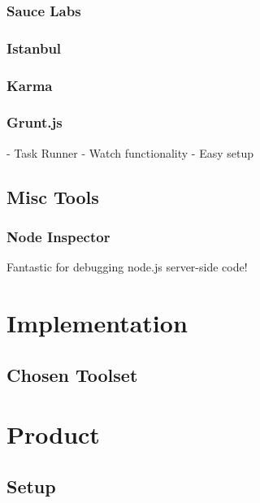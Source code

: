 \documentclass[11pt]{article}
\begin{document}
\subsubsection{Sauce Labs}


\subsubsection{Istanbul}


\subsubsection{Karma}

\subsubsection{Grunt.js}
- Task Runner
- Watch functionality
- Easy setup

\subsection{Misc Tools}
\subsubsection{Node Inspector}
Fantastic for debugging node.js server-side code!

\section{Implementation}

\subsection{Chosen Toolset}


\section{Product}

\subsection{Setup}
\end{document}
